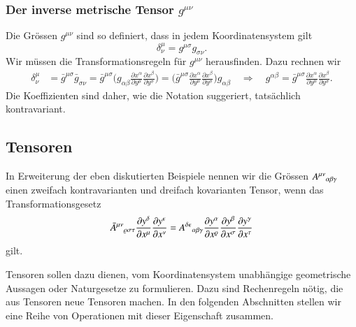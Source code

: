 \subsubsection{Der inverse metrische Tensor $g^{\mu\nu}$}
Die Grössen $g^{\mu\nu}$ sind so definiert, dass in jedem Koordinatensystem
gilt
\[
\delta^\mu_\nu = g^{\mu\sigma}g_{\sigma\nu}.
\]
Wir müssen die Transformationsregeln für $g^{\mu\nu}$ herausfinden.
Dazu rechnen wir
\begin{align*}
\delta^\mu_\nu
&=
\bar g^{\mu\sigma}\bar g_{\sigma\nu}
=
\bar g^{\mu\sigma}
\biggl(
g_{\alpha\beta}
\frac{\partial x^\alpha}{\partial y^\mu}
\frac{\partial x^\beta}{\partial y^\sigma}
\biggr)
=
\biggl(
\bar g^{\mu\sigma}
\frac{\partial x^\alpha}{\partial y^\mu}
\frac{\partial x^\beta}{\partial y^\sigma}
\biggr)
g_{\alpha\beta}
\quad
\Rightarrow
\quad
g^{\alpha\beta}
=
\bar g^{\mu\sigma}
\frac{\partial x^\alpha}{\partial y^\mu}
\frac{\partial x^\beta}{\partial y^\sigma}.
\end{align*}
Die Koeffizienten sind daher, wie die Notation suggeriert, tatsächlich
kontravariant.

\subsection{Tensoren}
In Erweiterung der eben diskutierten Beispiele nennen wir die Grössen
$
A^{\mu\nu}\mathstrut_{\alpha\beta\gamma}
$
einen zweifach kontravarianten und dreifach kovarianten Tensor, wenn
das Transformationsgesetz
\[
\bar 
A^{\mu\nu}\mathstrut_{\varrho\sigma\tau}
\frac{\partial y^\delta}{\partial x^\mu}
\frac{\partial y^\epsilon}{\partial x^\nu}
=
A^{\delta\epsilon}\mathstrut_{\alpha\beta\gamma}
\frac{\partial y^\alpha}{\partial x^\varrho}
\frac{\partial y^\beta}{\partial x^\sigma}
\frac{\partial y^\gamma}{\partial x^\tau}
\]
gilt.

Tensoren sollen dazu dienen, vom Koordinatensystem unabhängige
geometrische Aussagen oder Naturgesetze zu formulieren.
Dazu sind Rechenregeln nötig, die aus Tensoren neue Tensoren
machen.
In den folgenden Abschnitten stellen wir eine Reihe von Operationen
mit dieser Eigenschaft zusammen.

